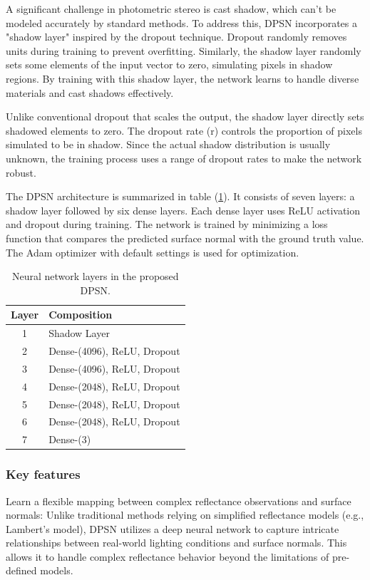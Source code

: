 A significant challenge in photometric stereo is cast shadow, which can't be modeled accurately by standard methods. To address this, DPSN incorporates a "shadow layer" inspired by the dropout technique. Dropout randomly removes units during training to prevent overfitting. Similarly, the shadow layer randomly sets some elements of the input vector to zero, simulating pixels in shadow regions. By training with this shadow layer, the network learns to handle diverse materials and cast shadows effectively.

Unlike conventional dropout that scales the output, the shadow layer directly sets shadowed elements to zero. The dropout rate (r) controls the proportion of pixels simulated to be in shadow. Since the actual shadow distribution is usually unknown, the training process uses a range of dropout rates to make the network robust.

The DPSN architecture is summarized in table (\ref{tab:dpsn_layers}). It consists of seven layers: a shadow layer followed by six dense layers. Each dense layer uses ReLU activation and dropout during training. The network is trained by minimizing a loss function that compares the predicted surface normal with the ground truth value. The Adam optimizer with default settings is used for optimization.

\begin{table}[ht]
    \centering
    \begin{tabular}{|c|l|}
        \hline
        \textbf{Layer} & \textbf{Composition} \\
        \hline
        1 & Shadow Layer \\
        2 & Dense-(4096), ReLU, Dropout \\
        3 & Dense-(4096), ReLU, Dropout \\
        4 & Dense-(2048), ReLU, Dropout \\
        5 & Dense-(2048), ReLU, Dropout \\
        6 & Dense-(2048), ReLU, Dropout \\
        7 & Dense-(3) \\
        \hline
    \end{tabular}
    \caption{Neural network layers in the proposed DPSN.}
    \label{tab:dpsn_layers}
\end{table}

\subsubsection{Key features}
Learn a flexible mapping between complex reflectance observations and surface normals: Unlike traditional methods relying on simplified reflectance models (e.g., Lambert's model), DPSN utilizes a deep neural network to capture intricate relationships between real-world lighting conditions and surface normals. This allows it to handle complex reflectance behavior beyond the limitations of pre-defined models.


